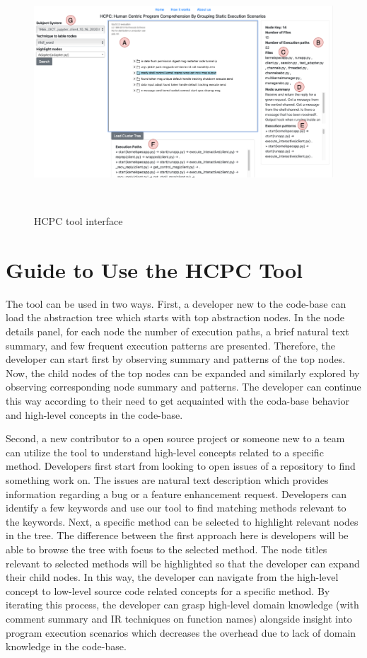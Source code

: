 \begin{figure}[h]
  \centering
  \includegraphics[width=\columnwidth]{figures/hla3/hla3_interface.png}
  \caption{HCPC tool interface }~\label{fig:interface}
\end{figure}


\section{Guide to Use the HCPC Tool}
\label{hla3:use_guide}
The tool can be used in two ways. First, a developer new to the code-base can load the abstraction tree which starts with top abstraction  nodes. In the node details panel, for each node the number of execution paths, a brief natural text summary, and few frequent execution patterns are presented. Therefore, the developer can start first by observing summary and patterns of the top nodes. Now, the child nodes of the top nodes can be expanded and similarly explored by observing corresponding node summary and patterns. The developer can continue this way according to their need to get acquainted with the coda-base behavior and high-level concepts in the code-base.

Second, a new contributor to a open source project or someone new to a team can utilize the tool to understand high-level concepts related to a specific method. Developers first start from looking to open issues of a repository to find something work on. The issues are natural text description which provides information regarding a bug or a feature enhancement request. Developers can identify a few keywords and use our tool to find matching methods relevant to the keywords. Next, a specific method can be selected to highlight relevant nodes in the tree. The difference between the first approach here is developers will be able to browse the tree with focus to the selected method. The node titles relevant to selected methods will be highlighted so that the developer can expand their child nodes. In this way, the developer can navigate from the high-level concept to low-level source code related concepts for a specific method. By iterating this process, the developer can grasp high-level domain knowledge (with comment summary and IR techniques on function names) alongside insight into program execution scenarios which decreases the overhead due to lack of domain knowledge in the code-base. 

